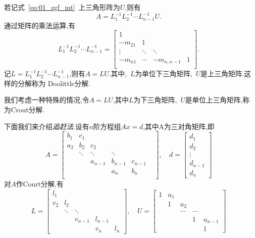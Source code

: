 \documentclass[a4paper,cs4size,adobefonts,fancyhdr]{ctexart}[2005/11/25]
\newcommand{\upcite}[1]{\textsuperscript{\textsuperscript{\cite{#1}}}}
\begin{document}
若记式~\eqref{eq:01_zgf_mt}~上三角形阵为$U$,则有
\begin{equation*}
A=L_1^{-1}L_2^{-1}\cdots L_{n-1}^{-1}U.
\end{equation*}
通过矩阵的乘法运算,有
\begin{equation}
 L_1^{-1}L_2^{-1}\cdots L_{n-1}^{-1}=
 \begin{bmatrix}
 1 	 &	   &	         & \\
 -m_{21} &   1     &             & \\
 \vdots  &  \ddots &  \ddots     & \\
 -m_{n1} &  \cdots &  -m_{n,n-1} & 1 \\
 \end{bmatrix}.
\end{equation}
记$L=L_1^{-1}L_2^{-1}\cdots L_{n-1}^{-1}$,则有$A=LU$.其中,~$L$为单位下三角矩阵,~$U$是上三角矩阵.这样的分解称为
Doolittle分解.\par
我们考虑一种特殊的情况,令$A=LU$,其中$L$为下三角矩阵,~$U$是单位上三角矩阵,称为Crout分解.\par
下面我们来介绍\emph{追赶法}\upcite{陈国2002}.设有$n$阶方程组$Ax=d$,其中A为三对角矩阵,即
\begin{equation}
A=\begin{bmatrix}
  b_1 & c_1    &        &         &    & \\
  a_2 & b_2    & c_2    &         &    & \\
      & \ddots & \ddots & \ddots  &    & \\
      &        & a_{n-1} & b_{n-1} & c_{n-1} \\
      &        &         &  a_n   &   b_n    \\
  \end{bmatrix}
  ,\quad
  d=\begin{bmatrix}
     d_1 \\
     d_2 \\
     \vdots \\
     d_{n-1} \\
     d_n
    \end{bmatrix}
\end{equation}
对$A$作Court分解,有
\begin{equation}
L=\begin{bmatrix}
  l_1 &   	&     	     &   &   \\
  v_2 & l_2 	&	     &   &   \\
      & \ddots  &  \ddots    &   &  \\
      &         &   v_{n-1}  & l_{n-1} & \\
      &         &            &   v_n  &  l_n 
  \end{bmatrix}
,\quad
U=\begin{bmatrix}
   1  &  u_1 \\
      &   1  &   u_2  \\
      &      &   \cdots  &  \cdots  \\
      &      &           &    1    &   u_{n-1} \\
      &      &           &         &       1   
  \end{bmatrix}
\end{equation}
\end{document}
